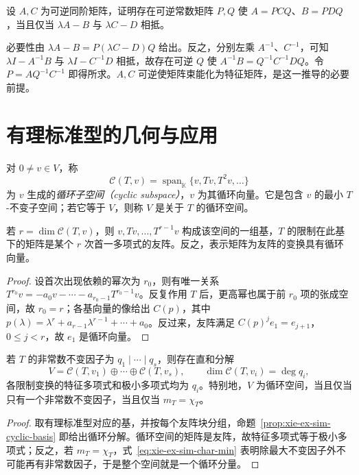 \begin{example}
设 $A,C$ 为可逆同阶矩阵，证明存在可逆常数矩阵 $P,Q$ 使 $A=PCQ$、$B=PDQ$，当且仅当 $\lambda A-B$ 与 $\lambda C-D$ 相抵。
\end{example}
\begin{solve}
必要性由 $\lambda A-B=P(\lambda C-D)Q$ 给出。反之，分别左乘 $A^{-1}$、$C^{-1}$，可知 $\lambda I-A^{-1}B$ 与 $\lambda I-C^{-1}D$ 相抵，故存在可逆 $Q$ 使 $A^{-1}B=Q^{-1}C^{-1}DQ$。令 $P=AQ^{-1}C^{-1}$ 即得所求。$A,C$ 可逆使矩阵束能化为特征矩阵，是这一推导的必要前提。
\end{solve}

\section{有理标准型的几何与应用}
\label{sec:xie-ex-sim-cyclic}

\begin{definition}
对 $0\ne v\in V$，称
\[
 \mathcal C(T,v)=\operatorname{span}_{\mathbb K}\{v,Tv,T^2v,\ldots\}
\]
为 $v$ 生成的\emph{循环子空间（cyclic subspace）}，$v$ 为其循环向量。它是包含 $v$ 的最小 $T$-不变子空间；若它等于 $V$，则称 $V$ 是关于 $T$ 的循环空间。
\end{definition}

\begin{proposition}
\label{prop:xie-ex-sim-cyclic-basis}
若 $r=\dim\mathcal C(T,v)$，则 $v,Tv,\ldots,T^{r-1}v$ 构成该空间的一组基，$T$ 的限制在此基下的矩阵是某个 $r$ 次首一多项式的友阵。反之，表示矩阵为友阵的变换具有循环向量。
\end{proposition}
\begin{proof}
设首次出现依赖的幂次为 $r_0$，则有唯一关系 $T^{r_0}v=-a_0v-\cdots-a_{r_0-1}T^{r_0-1}v$。反复作用 $T$ 后，更高幂也属于前 $r_0$ 项的张成空间，故 $r_0=r$；各基向量的像给出 $C(p)$，其中 $p(\lambda)=\lambda^r+a_{r-1}\lambda^{r-1}+\cdots+a_0$。反过来，友阵满足 $C(p)^je_1=e_{j+1}$，$0\leq j<r$，故 $e_1$ 是循环向量。
\end{proof}

\begin{theorem}[循环分解与循环空间判据]
\label{thm:xie-ex-sim-cyclic}
若 $T$ 的非常数不变因子为 $q_1\mid\cdots\mid q_s$，则存在直和分解
\[
 V=\mathcal C(T,v_1)\oplus\cdots\oplus\mathcal C(T,v_s),
 \qquad \dim\mathcal C(T,v_i)=\deg q_i,
\]
各限制变换的特征多项式和极小多项式均为 $q_i$。特别地，$V$ 为循环空间，当且仅当只有一个非常数不变因子，当且仅当 $m_T=\chi_T$。
\end{theorem}
\begin{proof}
取有理标准型对应的基，并按每个友阵块分组，命题~\ref{prop:xie-ex-sim-cyclic-basis} 即给出循环分解。循环空间的矩阵是友阵，故特征多项式等于极小多项式；反之，若 $m_T=\chi_T$，式~\eqref{eq:xie-ex-sim-char-min} 表明除最大不变因子外不可能再有非常数因子，于是整个空间就是一个循环分量。
\end{proof}

